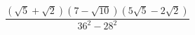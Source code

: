 \begin{ex}[type=calculate]
	\begin{condition}
		\( \dfrac{(\sqrt{5}+\sqrt{2})(7-\sqrt{10})(5\sqrt{5}-2\sqrt{2})}{36^2-28^2} \)
	\end{condition}
\end{ex}